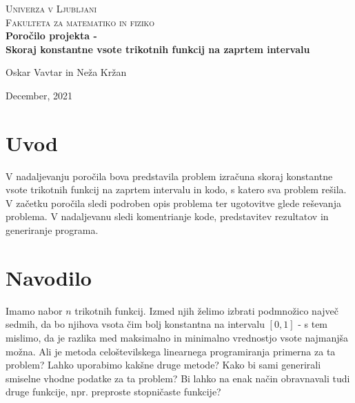 \documentclass[11pt]{article}
\theoremstyle{definition}
\newcommand{\1}{\mathbbm{1}}
\begin{document}
\begin{titlepage}
\center
\textsc{\LARGE Univerza v Ljubljani}\\[0.6cm]
\textsc{\Large Fakulteta za matematiko in fiziko}\\[3.6cm]

{\huge\bfseries Poročilo projekta - \\
Skoraj konstantne vsote trikotnih funkcij na zaprtem intervalu}\\[0.4cm]


\vfill\vfill\vfill

{ Oskar Vavtar in Neža Kržan}

{ December, 2021}

\vfill

\end{titlepage}

\tableofcontents
\newpage


\section{Uvod}
\vspace{0.5cm}

V nadaljevanju poročila bova predstavila problem izračuna skoraj konstantne vsote trikotnih funkcij na zaprtem intervalu in kodo, s katero sva problem rešila. 
V začetku poročila sledi podroben opis problema ter ugotovitve glede reševanja problema. V nadaljevanu sledi komentrianje kode, predstavitev rezultatov in generiranje programa.


\section{Navodilo}
\vspace{0.5cm}

Imamo nabor $n$ trikotnih funkcij. Izmed njih želimo izbrati podmnožico največ sedmih, da bo njihova vsota čim bolj konstantna na intervalu $[0,1]$ - s tem mislimo, da je razlika med maksimalno in minimalno vrednostjo vsote najmanjša možna. Ali je metoda celoštevilskega linearnega programiranja primerna za ta problem? Lahko uporabimo kakšne druge metode? Kako bi sami generirali smiselne vhodne podatke za ta problem? Bi lahko na enak način obravnavali tudi druge funkcije, npr. preproste stopničaste funkcije?
\end{document}
